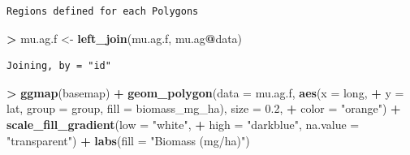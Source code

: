 \documentclass[]{krantz}
\makeatletter
\newenvironment{Shaded}{\begin{snugshade}}{\end{snugshade}}
\newcommand{\DataTypeTok}[1]{\textcolor[rgb]{0.27,0.27,0.27}{#1}}
\newcommand{\ErrorTok}[1]{\textcolor[rgb]{0.14,0.14,0.14}{\textbf{#1}}}
\newcommand{\FloatTok}[1]{\textcolor[rgb]{0.06,0.06,0.06}{#1}}
\newcommand{\KeywordTok}[1]{\textcolor[rgb]{0.27,0.27,0.27}{\textbf{#1}}}
\newcommand{\NormalTok}[1]{#1}
\newcommand{\OperatorTok}[1]{\textcolor[rgb]{0.43,0.43,0.43}{\textbf{#1}}}
\newcommand{\StringTok}[1]{\textcolor[rgb]{0.5,0.5,0.5}{#1}}
\newenvironment{kframe}{%
\medskip{}
\setlength{\fboxsep}{.8em}
 \def\at@end@of@kframe{}%
 \ifinner\ifhmode%
  \def\at@end@of@kframe{\end{minipage}}%
  \begin{minipage}{\columnwidth}%
 \fi\fi%
 \def\FrameCommand##1{\hskip\@totalleftmargin \hskip-\fboxsep
 \colorbox{shadecolor}{##1}\hskip-\fboxsep
     \hskip-\linewidth \hskip-\@totalleftmargin \hskip\columnwidth}%
 \MakeFramed {\advance\hsize-\width
   \@totalleftmargin\z@ \linewidth\hsize
   \@setminipage}}%
 {\par\unskip\endMakeFramed%
 \at@end@of@kframe}
\renewenvironment{Shaded}{\begin{kframe}}{\end{kframe}}
\makeatother
\begin{document}
\begin{Shaded}
\end{Shaded}

\begin{verbatim}
Regions defined for each Polygons
\end{verbatim}

\begin{Shaded}
\begin{Highlighting}[]
\OperatorTok{>}\StringTok{ }\NormalTok{mu.ag.f <-}\StringTok{ }\KeywordTok{left_join}\NormalTok{(mu.ag.f, mu.ag}\OperatorTok{@}\NormalTok{data)}
\end{Highlighting}
\end{Shaded}

\begin{verbatim}
Joining, by = "id"
\end{verbatim}

\begin{Shaded}
\begin{Highlighting}[]
\OperatorTok{>}\StringTok{ }\KeywordTok{ggmap}\NormalTok{(basemap) }\OperatorTok{+}\StringTok{ }\KeywordTok{geom_polygon}\NormalTok{(}\DataTypeTok{data =}\NormalTok{ mu.ag.f, }\KeywordTok{aes}\NormalTok{(}\DataTypeTok{x =}\NormalTok{ long, }
\OperatorTok{+}\StringTok{   }\DataTypeTok{y =}\NormalTok{ lat, }\DataTypeTok{group =}\NormalTok{ group, }\DataTypeTok{fill =}\NormalTok{ biomass_mg_ha), }\DataTypeTok{size =} \FloatTok{0.2}\NormalTok{, }
\OperatorTok{+}\StringTok{   }\DataTypeTok{color =} \StringTok{"orange"}\NormalTok{) }\OperatorTok{+}\StringTok{ }\KeywordTok{scale_fill_gradient}\NormalTok{(}\DataTypeTok{low =} \StringTok{"white"}\NormalTok{, }
\OperatorTok{+}\StringTok{   }\DataTypeTok{high =} \StringTok{"darkblue"}\NormalTok{, }\DataTypeTok{na.value =} \StringTok{"transparent"}\NormalTok{) }\OperatorTok{+}\StringTok{ }\KeywordTok{labs}\NormalTok{(}\DataTypeTok{fill =} \StringTok{"Biomass (mg/ha)"}\NormalTok{)}
\end{Highlighting}
\end{Shaded}
\end{document}
